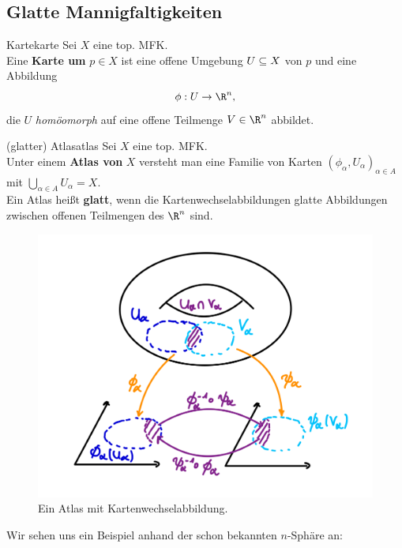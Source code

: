 \subsection{Glatte Mannigfaltigkeiten}
\label{subsec: smoothmfn}
\begin{definition}{Karte}{karte}
Sei $X$ eine top. MFK.\\
Eine \textbf{Karte um} $p \in X$ ist eine offene Umgebung $U \subseteq X$ von $p$ und eine Abbildung 
\begin{equation}
\phi: U \to \R^n,
\end{equation}
die $U$ \textit{homöomorph} auf eine offene Teilmenge $V \in \R^n$ abbildet.
\end{definition}
\begin{definition}{(glatter) Atlas}{atlas}
Sei $X$ eine top. MFK.\\
Unter einem \textbf{Atlas von} $X$ versteht man eine Familie von Karten $(\phi_\alpha, U_\alpha)_{\alpha \in A}$ mit $\bigcup_{\alpha \in A} U_\alpha = X$.\\
Ein Atlas heißt \textbf{glatt}, wenn die Kartenwechselabbildungen glatte Abbildungen zwischen offenen Teilmengen des $\R^n$ sind.
\begin{figure}[H]
\label{fig:kartenwechsel}
\centering
\includegraphics[width=0.3\linewidth]{Bilder/kartenwechsel.png}
\caption{Ein Atlas mit Kartenwechselabbildung.}
\end{figure}
\end{definition}
Wir sehen uns ein Beispiel anhand der schon bekannten $n$-Sphäre an:
